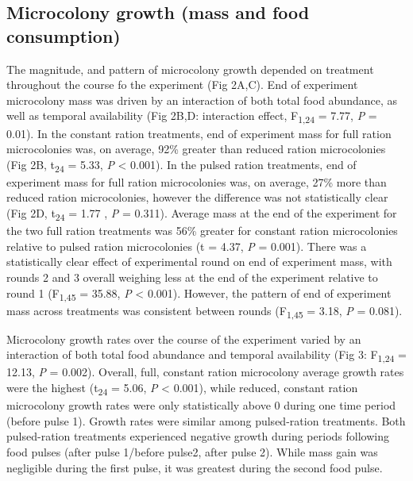 \documentclass[11pt,]{article}
\begin{document}
\hypertarget{microcolony-growth-mass-and-food-consumption}{%
\subsection{Microcolony growth (mass and food
consumption)}\label{microcolony-growth-mass-and-food-consumption}}

The magnitude, and pattern of microcolony growth depended on treatment
throughout the course fo the experiment (Fig 2A,C). End of experiment
microcolony mass was driven by an interaction of both total food
abundance, as well as temporal availability (Fig 2B,D: interaction
effect, F\textsubscript{1,24} = 7.77, \emph{P} = 0.01). In the constant
ration treatments, end of experiment mass for full ration microcolonies
was, on average, 92\% greater than reduced ration microcolonies (Fig 2B,
t\textsubscript{24} = 5.33, \emph{P} \textless{} 0.001). In the pulsed
ration treatments, end of experiment mass for full ration microcolonies
was, on average, 27\% more than reduced ration microcolonies, however
the difference was not statistically clear (Fig 2D, t\textsubscript{24}
= 1.77 , \emph{P} = 0.311). Average mass at the end of the experiment
for the two full ration treatments was 56\% greater for constant ration
microcolonies relative to pulsed ration microcolonies (t = 4.37,
\emph{P} = 0.001). There was a statistically clear effect of
experimental round on end of experiment mass, with rounds 2 and 3
overall weighing less at the end of the experiment relative to round 1
(F\textsubscript{1,45} = 35.88, \emph{P} \textless{} 0.001). However,
the pattern of end of experiment mass across treatments was consistent
between rounds (F\textsubscript{1,45} = 3.18, \emph{P} = 0.081).

Microcolony growth rates over the course of the experiment varied by an
interaction of both total food abundance and temporal availability (Fig
3: F\textsubscript{1,24} = 12.13, \emph{P} = 0.002). Overall, full,
constant ration microcolony average growth rates were the highest
(t\textsubscript{24} = 5.06, \emph{P} \textless{} 0.001), while reduced,
constant ration microcolony growth rates were only statistically above 0
during one time period (before pulse 1). Growth rates were similar among
pulsed-ration treatments. Both pulsed-ration treatments experienced
negative growth during periods following food pulses (after pulse
1/before pulse2, after pulse 2). While mass gain was negligible during
the first pulse, it was greatest during the second food pulse.
\end{document}
